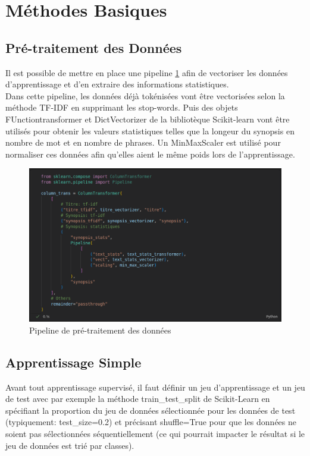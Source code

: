 \section{Méthodes Basiques}

\subsection{Pré-traitement des Données}
Il est possible de mettre en place une pipeline \ref{pipeline_1} afin de vectoriser les données d'apprentissage et d'en extraire des informations statistiques.\\
Dans cette pipeline, les données déjà tokénisées vont être vectorisées selon la méthode TF-IDF en supprimant les stop-words. Puis des objets \textsf{FUnctiontransformer} et \textsf{DictVectorizer} de la bibliotèque Scikit-learn \cite{scikit_learn} vont être utilisés pour obtenir les valeurs statistiques telles que la longeur du synopsis en nombre de mot et en nombre de phrases. Un \textsf{MinMaxScaler} est utilisé pour normaliser ces données afin qu'elles aient le même poids lors de l'apprentissage.

\begin{figure}
    \center
    \includegraphics[scale=.3]{img/pipeline_1.png}
    \caption{Pipeline de pré-traitement des données}
    \label{pipeline_1}
\end{figure}

\subsection{Apprentissage Simple}
Avant tout apprentissage supervisé, il faut définir un jeu d'apprentissage et un jeu de test avec par exemple la méthode \textsf{train\_test\_split} de Scikit-Learn en spécifiant la proportion du jeu de données sélectionnée pour les données de test (typiquement: \textsf{test\_size=0.2}) et précisant \textsf{shuffle=True} pour que les données ne soient pas sélectionnées séquentiellement (ce qui pourrait impacter le résultat si le jeu de données est trié par classes).

